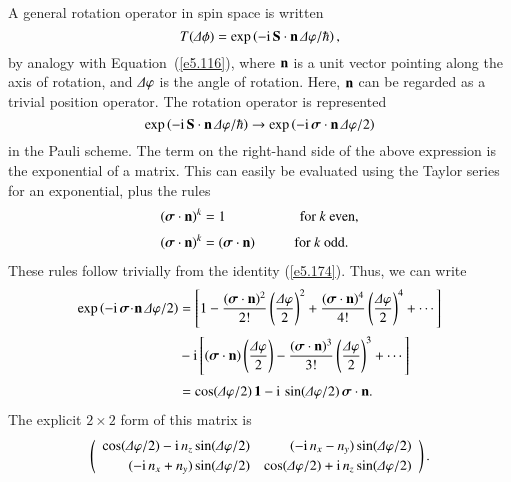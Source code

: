 A general rotation operator in spin space is written
\begin{equation}
T ({\mit\Delta}\phi) = \exp\left(-{\rm i} \,{\bf S}\cdot{\bf n}\,{\mit\Delta}\varphi/\hbar\right),
\end{equation}
by analogy with Equation~(\ref{e5.116}), where ${\bf n}$ is a unit vector pointing along
the axis of rotation, and ${\mit\Delta}\varphi$ is the angle of rotation.
Here, ${\bf n}$ can be regarded as a trivial position operator.  The
rotation operator is represented 
\begin{equation}
\exp\left(-{\rm i} \,{\bf S}\cdot{\bf n}\,{\mit\Delta}\varphi/\hbar\right)\rightarrow
\exp\left(-{\rm i} \,\bsigma\cdot{\bf n}\,{\mit\Delta}\varphi/2\right)
\end{equation}
in the Pauli scheme. 
The term on the right-hand side of the above  expression is the exponential
of a matrix. This can easily be evaluated using the Taylor series for an exponential,
plus the rules
\begin{align}
(\mbox{\boldmath$\sigma$}\cdot {\bf n})^k &= 1 \mbox{\hspace{1.88cm}for $k$ even},\\[0.5ex]
(\mbox{\boldmath$\sigma$}\cdot {\bf n})^k &=(\mbox{\boldmath$\sigma$}\cdot {\bf n})
 \mbox{\hspace{1cm}for $k$ odd}.
\end{align}
These rules follow trivially from the identity (\ref{e5.174}).  Thus, we can write
\begin{align}
\exp\left(-{\rm i} \,\bsigma\!\cdot\!{\bf n}\,{\mit\Delta}\varphi/2\right)&= 
\left[ 1 - \frac{(\bsigma \cdot {\bf n})^2}{2!} \left(\frac{{\mit\Delta}\varphi}{2}
\right)^2 + \frac{(\bsigma  \cdot  {\bf n})^4}{4!} \left(\frac{{\mit\Delta}\varphi}{2}
\right)^4 + \cdots\right]\nonumber\\[0.5ex]
&- {\rm i} \left[ (\bsigma  \cdot {\bf n} )\left( \frac{{\mit\Delta}\varphi}{2}\right)-
\frac{(\bsigma  \cdot  {\bf n})^3}{3!} \left(\frac{{\mit\Delta}\varphi}{2}\right)^3
+ \cdots\right]\nonumber\\[0.5ex]
&= \cos({\mit\Delta}\varphi/2)\,{\bf 1}- {\rm i}\,\sin ({\mit\Delta}\varphi/2)\,\bsigma\cdot{\bf n}.
\end{align}
The explicit $2\times 2$ form of this matrix is
\begin{equation}
\left(\begin{array}{rr} 
\cos({\mit\Delta}\varphi/2) - {\rm i}\,n_z \sin({\mit\Delta}\varphi/2)&
(-{\rm i}\,n_x - n_y) \sin({\mit\Delta}\varphi/2) \\[0.5ex]
(-{\rm i}\,n_x + n_y) \sin({\mit\Delta}\varphi/2) &
\cos({\mit\Delta}\varphi/2) + {\rm i}\, n_z \sin({\mit\Delta}\varphi/2)
\end{array} \right).
\end{equation}
